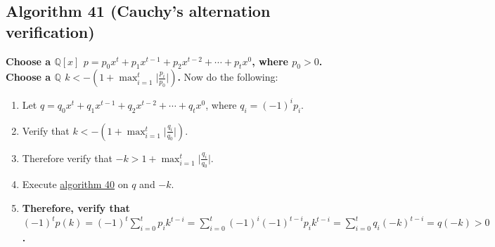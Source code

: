 \documentclass[twocolumn]{article}
\begin{document}
		\subsection{Algorithm 41 (Cauchy's alternation verification)}\label{sec:algorithm 41}
			\textbf{Choose a $\mathbb{Q}[x]$ $p=p_0x^t+p_1x^{t-1}+p_2x^{t-2}+\cdots+p_tx^0$, where $p_0>0$. Choose a $\mathbb{Q}$ $k<-(1+\max_{i=1}^t\lvert\frac{p_i}{p_0}\rvert)$.} Now do the following:
			\begin{enumerate}
				\item Let $q=q_0x^t+q_1x^{t-1}+q_2x^{t-2}+\cdots+q_tx^0$, where $q_i=(-1)^ip_i$.
				\item Verify that $k<-(1+\max_{i=1}^t\lvert\frac{q_i}{q_0}\rvert)$.
				\item Therefore verify that $-k>1+\max_{i=1}^t\lvert\frac{q_i}{q_0}\rvert$.
				\item Execute \hyperref[sec:algorithm 40]{algorithm 40} on $q$ and $-k$.
				\item \textbf{Therefore, verify that $(-1)^tp(k)=(-1)^t\sum_{i=0}^t p_ik^{t-i}=\sum_{i=0}^t (-1)^i(-1)^{t-i}p_ik^{t-i}=\sum_{i=0}^t q_i(-k)^{t-i}=q(-k)>0$.}
			\end{enumerate}
\end{document}
